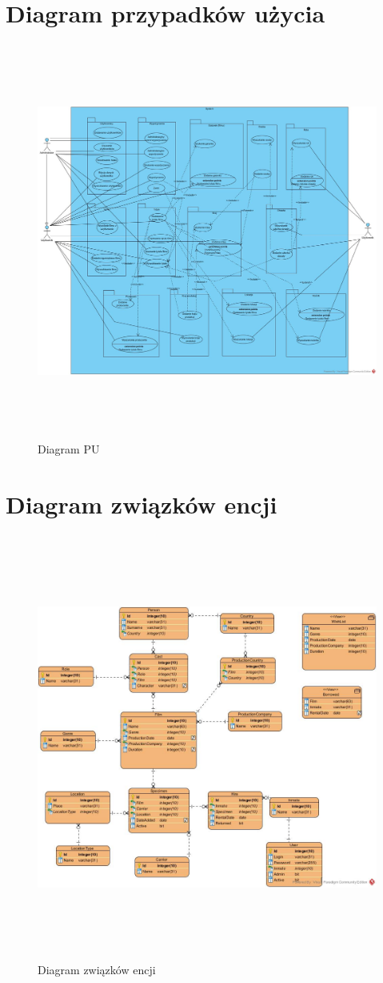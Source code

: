 \documentclass{article}
\begin{document}
	\section{Diagram przypadków użycia}
	\begin{figure}[!ht]	
		\centering
		\includegraphics[height=13cm]{PU.jpg}
		\caption{Diagram PU}
		\label{fig:obrazek 1}
	\end{figure}
\newpage
	\section{Diagram związków encji}
		\begin{figure}[!ht]	
		\centering
		\includegraphics[height=14cm]{diagram_zwiazkow_encji.jpg}
		\caption{Diagram związków encji}
		\label{fig:obrazek 2}
	\end{figure}
\newpage
\end{document}
